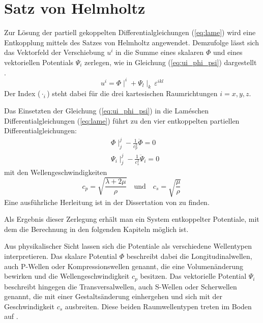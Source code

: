 \section{Satz von Helmholtz}
\label{sec:Helmholtz}
Zur Lösung der partiell gekoppelten Differentialgleichungen (\ref{eq:lame}) wird eine Entkopplung mittels des Satzes von Helmholtz angewendet.
Demzufolge lässt sich das Vektorfeld der Verschiebung \(u^{i}\) in die Summe eines skalaren $\Phi$ und eines vektoriellen Potentials $\Psi_{i}$ zerlegen, wie in Gleichung (\ref{eq:ui_phi_psi}) dargestellt \citep{Mueller2007}.
\begin{equation}\label{eq:ui_phi_psi}
	u^{i} = \Phi\mid^{i} + \Psi_{l}\mid_{k}\,\varepsilon^{ikl}
\end{equation}
Der Index ($\cdot_i$) steht dabei für die drei kartesischen Raumrichtungen \( i = x, y, z\).

Das Einsetzten der Gleichung (\ref{eq:ui_phi_psi}) in die Laméschen Differentialgleichungen (\ref{eq:lame}) führt zu den vier entkoppelten partiellen Differentialgleichungen:
\begin{subequations}\label{eq:phi_psi_wave}
	\begin{align}
		&\Phi\mid^{j}_{j} - \frac{1}{c_p^{2}}\ddot{\Phi} = 0 \label{eq:phi_wave}\\
		&\Psi_{i}\mid^{j}_{j} - \frac{1}{c_s^{2}}\ddot{\Psi}_{i} = 0 \label{eq:psi_wave}
	\end{align}
\end{subequations}
mit den Wellengeschwindigkeiten 
\begin{equation}\label{eq:cp_cs}
	c_p = \sqrt{\frac{\lambda + 2\mu}{\rho}} \quad \text{und} \quad
	c_s = \sqrt{\frac{\mu}{\rho}}\,
\end{equation}
 Eine ausführliche Herleitung ist in der Dissertation von \cite{Fruehe2010} zu finden.
 
 Als Ergebnis dieser Zerlegung erhält man ein System entkoppelter Potentiale, mit dem die Berechnung in den folgenden Kapiteln möglich ist.

Aus physikalischer Sicht lassen sich die Potentiale als verschiedene Wellentypen interpretieren.
Das skalare Potential $\Phi$ beschreibt dabei die Longitudinalwellen, auch P-Wellen oder Kompressionswellen genannt, die eine Volumenänderung bewirken und die Wellengeschwindigkeit $c_p$ besitzen.
Das vektorielle Potential $\Psi_{i}$ beschreibt hingegen die Transversalwellen, auch S-Wellen oder Scherwellen genannt, die mit einer Gestaltsänderung einhergehen und sich mit der Geschwindigkeit $c_s$ ausbreiten. Diese beiden Raumwellentypen treten im Boden auf \citep{Petersen2000}.

